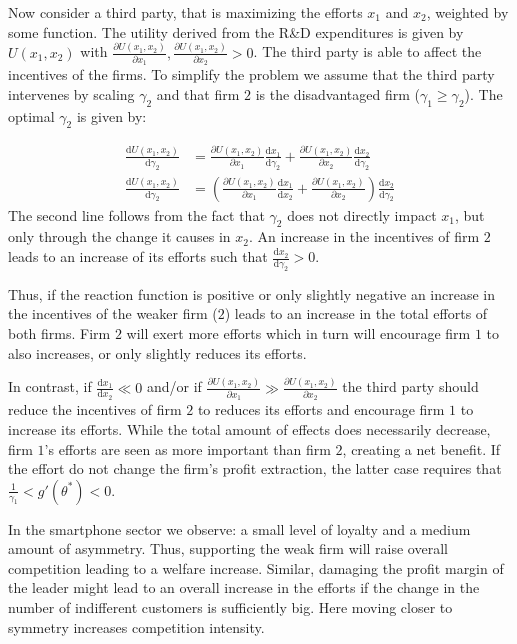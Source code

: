 \documentclass[a4paper, 11pt]{article}
\renewcommand{\d}{\text{d}}
\begin{document}
Now consider a third party, that is maximizing the efforts $x_1$ and $x_2$, weighted by some function. The utility derived from the R\&D expenditures is given by $U(x_1,x_2)$ with $\frac{\partial U(x_1,x_2)}{\partial x_1},\frac{\partial U(x_1,x_2)}{\partial x_2}>0$. The third party is able to affect the incentives of the firms. To simplify the problem we assume that the third party intervenes by scaling $\gamma_2$ and that firm $2$ is the disadvantaged firm ($\gamma_1\geq\gamma_2$). The optimal $\gamma_2$ is given by:

\begin{align}
\frac{\d U(x_1,x_2)}{\d \gamma_2} &= \frac{\partial U(x_1,x_2)}{\partial x_1}\frac{\d x_1}{\d \gamma_2} + \frac{\partial U(x_1,x_2)}{\partial x_2}\frac{\d x_2}{\d \gamma_2}\\
\frac{\d U(x_1,x_2)}{\d \gamma_2} &= \left(\frac{\partial U(x_1,x_2)}{\partial x_1}\frac{\d x_1}{\d x_2}+ \frac{\partial U(x_1,x_2)}{\partial x_2}\right)\frac{\d x_2}{\d \gamma_2}
\end{align}
The second line follows from the fact that $\gamma_2$ does not directly impact $x_1$, but only through the change it causes in $x_2$. An increase in the incentives of firm $2$ leads to an increase of its efforts such that $\frac{\d x_2}{\d \gamma_2}>0$. 

Thus, if the reaction function is positive or only slightly negative an increase in the incentives of the weaker firm ($2$) leads to an increase in the total efforts of both firms. Firm $2$ will exert more efforts which in turn will encourage firm $1$ to also increases, or only slightly reduces its efforts. 

In contrast, if $\frac{\d x_1}{\d x_2}\ll0$ and/or if $\frac{\partial U(x_1,x_2)}{\partial x_1}\gg \frac{\partial U(x_1,x_2)}{\partial x_2}$ the third party should reduce the incentives of firm $2$ to reduces its efforts and encourage firm $1$ to increase its efforts. While the total amount of effects does necessarily decrease, firm $1$'s efforts are seen as more important than firm $2$, creating a net benefit. If the effort do not change the firm's profit extraction, the latter case requires that $\frac{1}{\gamma_1}<g'(\theta^*)<0$.

In the smartphone sector we observe: a small level of loyalty and a medium amount of asymmetry. Thus, supporting the weak firm will raise overall competition leading to a welfare increase. Similar, damaging the profit margin of the leader might lead to an overall increase in the efforts if the change in the number of indifferent customers is sufficiently big. Here moving closer to symmetry increases competition intensity.
\end{document}

